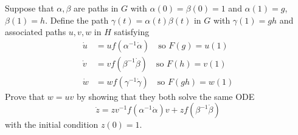 \documentclass[12pt]{article}
\begin{document}
\iffalse
\begin{answer}
\begin{align*}
\frac{d}{dt}\left(\delta(t)^{-1}f(X)\delta(t)\right)&=-\delta^{-1}\dot{\delta}\delta^{-1}f(X)\delta+\delta^{-1}f(X)\dot{\delta}\\
&=[\delta^{-1}f(X)\delta,\delta^{-1}\dot{\delta}].
\end{align*}
We also have
\begin{align*}
\frac{d}{dt}\left(f(\gamma^{-1}(t)X\gamma(t)\right)&=-f(\gamma^{-1}\dot{\gamma}\gamma^{-1}X\gamma)+f(\gamma^{-1}X\gamma\gamma^{-1}\dot{\gamma})\\
&=f[\gamma^{-1}X\gamma,\gamma^{-1}\dot{\gamma}]\\
&=[f(\gamma^{-1}X\gamma),f(\gamma^{-1}\dot{\gamma})]\\
&=[f(\gamma^{-1}X\gamma),\delta^{-1}\dot{\delta}]
\end{align*}
Therefore $\delta^{-1}(t)f(X)\delta(t)$ and $f(\gamma(t)^{-1}X\gamma(t))$ are both solutions to the equation
\[\dot{z}=[z,\delta^{-1}\dot{\delta}]\]
with initial condition $\delta^{-1}(0)f(X)\delta(0)=f(\gamma(0)^{-1}X\gamma(0))=f(X)$. By uniqueness we know they are equal for all $t$, in particular for $t=1$, which implies the result.
\end{answer}
\fi

\begin{question}
Suppose that $\alpha,\beta$ are paths in $G$ with $\alpha(0)=\beta(0)=1$ and $\alpha(1)=g$, $\beta(1)=h$. Define the path $\gamma(t)=\alpha(t)\beta(t)$ in $G$ with $\gamma(1)=gh$ and associated paths $u,v,w$ in $H$ satisfying
\begin{align*}
\dot{u}&=uf(\alpha^{-1}\dot{\alpha})\quad\mbox{so }F(g)=u(1)\\
\dot{v}&=vf(\beta^{-1}\dot{\beta})\quad\mbox{so }F(h)=v(1)\\
\dot{w}&=wf(\gamma^{-1}\dot{\gamma})\quad\mbox{so }F(gh)=w(1)
\end{align*}
Prove that $w=uv$ by showing that they both solve the same ODE
\[\dot{z}=zv^{-1}f(\alpha^{-1}\dot{\alpha})v+zf(\beta^{-1}\dot{\beta})\]
with the initial condition $z(0)=1$.
\end{question}
\end{document}
